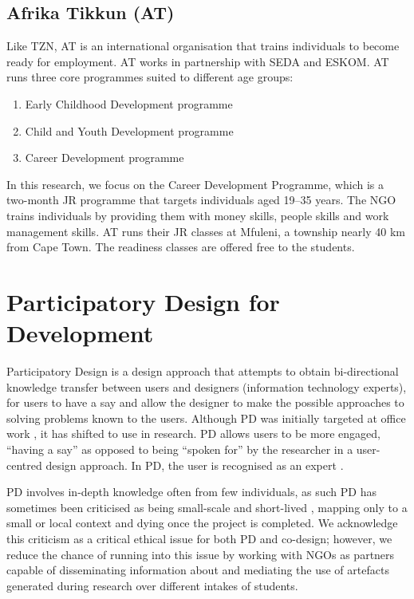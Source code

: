 \subsection{Afrika Tikkun (AT)}

Like TZN, AT is an international organisation that trains individuals to become ready
for employment. AT works in partnership with SEDA and ESKOM. AT runs three core
programmes suited to different age groups:

\begin{enumerate}
    \item Early Childhood Development programme
    \item Child and Youth Development programme
    \item Career Development programme
\end{enumerate}

In this research, we focus on the Career Development Programme, which is a
two-month JR programme that targets individuals aged 19--35 years. The NGO trains
individuals by providing them with money skills, people skills and work management
skills. AT runs their JR classes at Mfuleni, a township nearly 40 km from Cape Town.
The readiness classes are offered free to the students.

\section{Participatory Design for Development}

Participatory Design is a design approach that attempts to obtain bi-directional knowledge
transfer between users and designers (information technology experts), for users to
have a say and allow the designer to make the possible approaches to solving problems
known to the users. Although PD was initially targeted at office work
\cite{simonsen2013}, it has shifted to use in research. PD allows users to be
more engaged, ``having a say'' \cite{simonsen2013} as opposed to being
``spoken for'' by the researcher \cite{frascara2002} in a user-centred design approach.
In PD, the user is recognised as an expert \cite{bjorgvinsson2010}.

PD involves in-depth knowledge often from few individuals, as such PD has sometimes
been criticised as being small-scale and short-lived \cite{simonsen2013},
mapping only to a small or local context and dying once the project is completed. We
acknowledge this criticism as a critical ethical issue for both PD and co-design; however,
we reduce the chance of running into this issue by working with NGOs as partners capable
of disseminating information about and mediating the use of artefacts generated during
research over different intakes of students.

